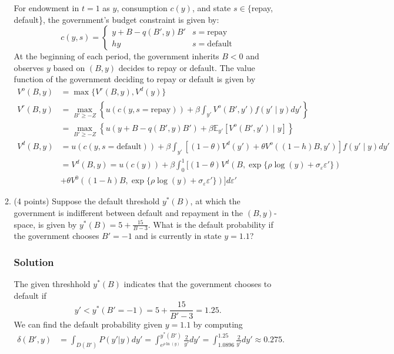 \documentclass[12pt]{article}
\begin{document}
\begin{enumerate}
\begin{enumerate}
        For endowment in $t=1$ as $y$, consumption $c(y)$, and state $s\in \{$repay, default\}, the government's budget constraint is given by:
        \[ c(y,s) = \begin{cases}
            y + B - q(B',y)B' & s=\text{repay}
            \\ hy & s=\text{default}
        \end{cases} 
        \]
        At the beginning of each period, the government inherits $B<0$ and observes $y$ based on $(B,y)$ decides to repay or default. The value function of the government deciding to repay or default is given by 
        \begin{align*}
            V^o(B,y) &= \max \{V^r(B,y), V^d(y)\}
            \\ V^r(B,y) &= \max_{B' \geq -Z} \left\{u(c(y,s=\text{repay}))+ \beta \int_{y'}  V^o(B',y') f(y' \mid y)dy' \right\}
            \\&= \max_{B' \geq -Z} \left\{u(y + B - q(B',y)B')+ \beta \mathbb{E}_{y'} \left[  V^o(B',y') \mid y  \right]\right\}
            \\ V^d(B,y) &=  u(c(y,s=\text{default})) + \beta \int_{y'}  \left[ (1-\theta)V^d(y') + \theta V^o((1-h)B,y') \right] f(y' \mid y) dy'
            \\ &= V^d(B, y) = u(c(y)) + \beta \int_0^1 [ (1 - \theta) V^d\left(B, \exp\{\rho \log(y) + \sigma_\varepsilon \varepsilon'\} \right) 
            \\ &+ \theta V^0\left((1 - h)B, \exp\{\rho \log(y) + \sigma_\varepsilon \varepsilon'\} \right) ] d\varepsilon'
        \end{align*}

        \item (4 points) Suppose the default threshold $y^*(B)$, at which the government is indifferent between default and repayment in the $(B, y)$-space, is given by $y^*(B) = 5 + \frac{15}{B - 3}$. What is the default probability if the government chooses $B' = -1$ and is currently in state $y = 1.1$?
        \subsubsection*{Solution}

        The given threshhold $y^*(B)$ indicates that the government chooses to default if 
        \[ y' < y^*(B' = -1) = 5 + \frac{15}{B' - 3}= 1.25.\]
        We can find  the default probability given  $y = 1.1$ by computing 
        \begin{align*}
            \delta(B',y) &= \int_{D(B')} P(y'|y)dy'
            = \int^{y^*(B')}_{e^{\rho\ln(y)}} \frac{2}{y'}dy'
            = \int^{1.25}_{1.0896} \frac{2}{y'}dy'
            \approx 0.275.
        \end{align*}


\end{enumerate}
\end{enumerate}
\end{document}
